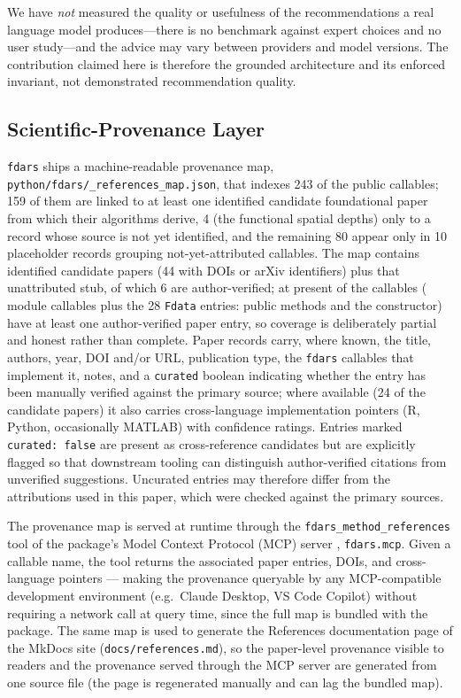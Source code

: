 We have \emph{not} measured the quality or usefulness of the recommendations
a real language model produces---there is no benchmark against expert choices
and no user study---and the advice may vary between providers and model
versions.  The contribution claimed here is therefore the grounded
architecture and its enforced invariant, not demonstrated recommendation
quality.

\subsection{Scientific-Provenance Layer}

\texttt{fdars} ships a machine-readable provenance map,
\texttt{python/fdars/\_references\_map.json}, that indexes 243 of
the \ncallables{} public callables; 159 of them are linked to at least one
identified candidate foundational paper from which their algorithms derive,
4 (the functional spatial depths) only to a record whose source is not yet
identified, and the remaining 80 appear only in 10 placeholder records
grouping not-yet-attributed callables.  The map contains \ndocpapers{}
identified candidate papers (44 with DOIs or arXiv identifiers) plus that
unattributed stub, of which 6 are author-verified; at
present \ncoverage{} of the \ncallables{} callables (\npubliccallables{} module
callables plus the 28 \texttt{Fdata} entries: \nfdata{} public methods and the
constructor) have at least one author-verified paper entry, so coverage is
deliberately partial and honest rather than complete.
Paper records carry, where known, the title, authors, year, DOI and/or URL,
publication type, the \texttt{fdars} callables that implement it, notes, and
a \texttt{curated} boolean indicating whether the entry has been manually
verified against the primary source; where available (24 of the \ndocpapers{} candidate papers)
it also carries cross-language implementation pointers (R, Python,
occasionally MATLAB) with confidence ratings.  Entries marked
\texttt{curated: false} are present as cross-reference candidates but are
explicitly flagged so that downstream tooling can distinguish author-verified
citations from unverified suggestions.  Uncurated entries may therefore
differ from the attributions used in this paper, which were checked against
the primary sources.

The provenance map is served at runtime through the
\texttt{fdars\_method\_references} tool of the package's Model Context
Protocol (MCP) server \citep{anthropic_mcp_2024}, \texttt{fdars.mcp}.
Given a callable name, the tool returns the associated paper entries, DOIs, and
cross-language pointers --- making the provenance queryable by any
MCP-compatible development environment (e.g.\ Claude Desktop, VS Code Copilot)
without requiring a network call at query time, since the full map is bundled
with the package.  The same map is used to generate the References
documentation page of the MkDocs site (\texttt{docs/references.md}), so the
paper-level provenance visible to readers and the provenance served through
the MCP server are generated from one source file (the page is regenerated
manually and can lag the bundled map).

